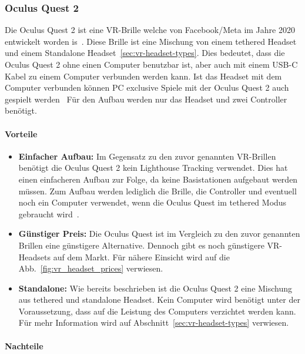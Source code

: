 \subsubsection{Oculus Quest 2}\label{sec:oculus-quest-2}

Die Oculus Quest 2 ist eine VR-Brille welche von Facebook/Meta im Jahre 2020 entwickelt worden is~\cite{ADI_ROBERTSON_2020}.
Diese Brille ist eine Mischung von einem tethered Headset und einem Standalone Headset~\ref{sec:vr-headset-types}.
Dies bedeutet, dass die Oculus Quest 2 ohne einen Computer benutzbar ist, aber auch mit einem USB-C Kabel zu einem Computer verbunden werden kann.
Ist das Headset mit dem Computer verbunden können PC exclusive Spiele mit der Oculus Quest 2 auch gespielt werden~\cite{ADI_ROBERTSON_2020}
Für den Aufbau werden nur das Headset und zwei Controller benötigt.

\paragraph{Vorteile}

\begin{itemize}
    \item \textbf{Einfacher Aufbau:} Im Gegensatz zu den zuvor genannten VR-Brillen benötigt die Oculus Quest 2 kein Lighthouse Tracking verwendet.
    Dies hat einen einfacheren Aufbau zur Folge, da keine Basistationen aufgebaut werden müssen.
    Zum Aufbau werden lediglich die Brille, die Controller und eventuell noch ein Computer verwendet, wenn die Oculus Quest im tethered Modus gebraucht wird~\cite{MECHATECH}.
    \item \textbf{Günstiger Preis:} Die Oculus Quest ist im Vergleich zu den zuvor genannten Brillen eine günstigere Alternative.
    Dennoch gibt es noch günstigere VR-Headsets auf dem Markt.
    Für nähere Einsicht wird auf die Abb.~\ref{fig:vr_headset_prices} verwiesen.
    \item \textbf{Standalone:} Wie bereits beschrieben ist die Oculus Quest 2 eine Mischung aus tethered und standalone Headset.
    Kein Computer wird benötigt unter der Voraussetzung, dass auf die Leistung des Computers verzichtet werden kann.
    Für mehr Information wird auf Abschnitt~\ref{sec:vr-headset-types} verwiesen.
\end{itemize}

\paragraph{Nachteile}


